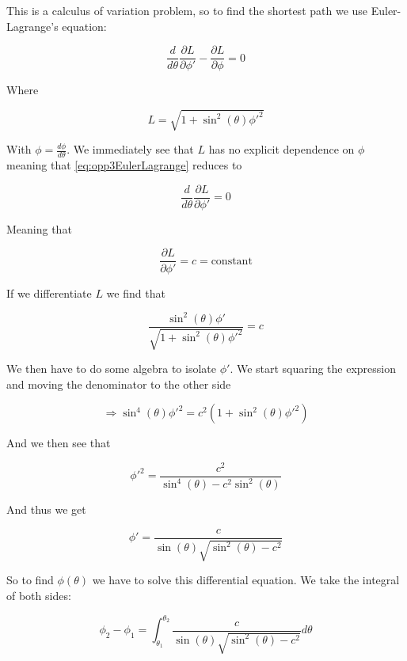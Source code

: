 \documentclass[a4paper,norsk, 10pt]{article}
\begin{document}
This is a calculus of variation problem, so to find the shortest path we use Euler-Lagrange's equation:

\begin{equation}
\frac{d}{d\theta}\frac{\partial L}{\partial \phi'} - \frac{\partial L}{\partial \phi} = 0
\label{eq:opp3EulerLagrange}
\end{equation}


Where

\begin{equation}
L =  \sqrt{ 1 + \sin^2(\theta) \phi'^2} 
\end{equation}


With $\phi = \frac{d\phi}{d\theta}$. We immediately see that $L$ has no explicit dependence on $\phi$ meaning that \eqref{eq:opp3EulerLagrange} reduces to

$$
\frac{d}{d\theta}\frac{\partial L}{\partial \phi'} = 0
$$

Meaning that

\begin{equation}
\frac{\partial L}{\partial \phi'} = c = \text{constant}
\end{equation}

If we differentiate $L$ we find that

\begin{equation}
\frac{\sin^2(\theta)\phi'}{\sqrt{ 1 + \sin^2(\theta) \phi'^2} } = c
\end{equation}

We then have to do some algebra to isolate $\phi'$. We start squaring the expression and moving the denominator to the other side

$$
\Rightarrow \sin^4(\theta) \phi'^2 = c^2(1+\sin^2(\theta)\phi'^2)
$$

And we then see that

$$
\phi'^2 = \frac{c^2}{\sin^4(\theta) - c^2\sin^2(\theta)}
$$

And thus we get

\begin{equation}
\phi' = \frac{c}{\sin(\theta) \sqrt{\sin^2(\theta) - c^2}}
\end{equation}

So to find $\phi(\theta)$ we have to solve this differential equation. We take the integral of both sides:

\begin{equation}
\phi_2 - \phi_1 = \int_{\theta_1}^{\theta_2} \frac{c}{\sin(\theta) \sqrt{\sin^2(\theta) - c^2}} d\theta 
\end{equation}
\end{document}
